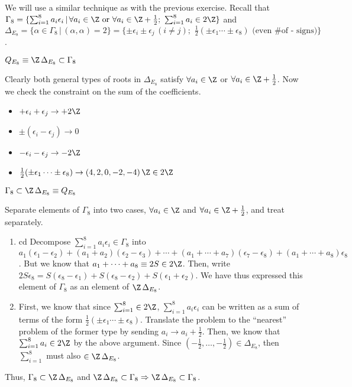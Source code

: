 \documentclass[11pt]{article}
\newenvironment{proof}[1][Proof]{\begin{trivlist}
\item[\hskip \labelsep {\bfseries #1}]}{\end{trivlist}}
\newenvironment{solution}[1][Solution]{\begin{trivlist}
\item[\hskip \labelsep {\bfseries #1}]}{\end{trivlist}}
\newenvironment{claim}[1][Claim]{\begin{trivlist}
\item[\hskip \labelsep {\bfseries #1}]}{\end{trivlist}}
\newcommand{\qed}{\nobreak \ifvmode \relax \else
      \ifdim\lastskip<1.5em \hskip-\lastskip
      \hskip1.5em plus0em minus0.5em \fi \nobreak
      \vrule height0.75em width0.5em depth0.25em\fi}
\begin{document}
\begin{solution}
We will use a similar technique as with the previous exercise.
Recall that $\Gamma_8 = \{ \sum_{i=1}^8 a_i \epsilon_i \, | \,
\forall a_i \in \Z \mbox{ or } \forall a_i \in \Z + \frac{1}{2};
\,\, \sum_{i=1}^8 a_i \in 2 \Z \}$ and $\Delta_{E_8} = \{ \alpha
\in \Gamma_8 \, | \, (\alpha,\alpha) = 2 \} = \{ \pm \epsilon_i
\pm \epsilon_j \, (i \not = j); \,\, \frac{1}{2}(\pm \epsilon_1
\cdots \pm \epsilon_8) \mbox{ (even \# of - signs)} \}$.
%
\begin{claim}
$Q_{E_8} \equiv \Z \, \Delta_{E_8} \subset \Gamma_8$
\end{claim}
%
\begin{proof}
Clearly both general types of roots in $\Delta_{E_8}$ satisfy
$\forall a_i \in \Z$ or $\forall a_i \in \Z + \frac{1}{2}$.  Now
we check the constraint on the sum of the coefficients.
%
\begin{itemize}
\item $+\epsilon_i + \epsilon_j \rightarrow +2\Z$ \item $\pm
(\epsilon_i - \epsilon_j ) \rightarrow 0$ \item $-\epsilon_i -
\epsilon_j \rightarrow -2 \Z$ \item $\frac{1}{2}(\pm \epsilon_1
\cdots \pm \epsilon_8) \rightarrow (4,2,0,-2,-4) \, \Z \in 2 \Z$

\end{itemize}
\end{proof}
%
\begin{claim}
$\Gamma_8 \subset \Z \, \Delta_{E_8} \equiv Q_{E_8}$
\end{claim}
%
\begin{proof}
Separate elements of $\Gamma_8$ into two cases, $\forall a_i \in
\Z$ and $\forall a_i \in \Z + \frac{1}{2}$, and treat separately.
\begin{enumerate}
\item cd Decompose $\sum_{i=1}^8 a_i \epsilon_i \in \Gamma_8$ into
$a_1 (\epsilon_1 - \epsilon_2) + (a_1+a_2)(\epsilon_2-\epsilon_3)
+ \cdots + (a_1+\cdots +a_7)(\epsilon_7 - \epsilon_8) +
(a_1+\cdots + a_8)\epsilon_8$.  But we know that $a_1+\cdots + a_8
\equiv 2 S \in 2 \Z$.  Then, write $2 S \epsilon_8 = S (\epsilon_8
- \epsilon_1) + S (\epsilon_8 - \epsilon_2) + S (\epsilon_1 +
\epsilon_2)$.  We have thus expressed this element of $\Gamma_8$
as an element of $\Z \, \Delta_{E_8}$.

\item First, we know that since $\sum _{i=1}^{8} \in 2 \Z$,
$\sum_{i=1}^{8} a_i \epsilon_i$ can be written as a sum of terms
of the form $\frac{1}{2}(\pm \epsilon_1 \cdots \pm \epsilon_8)$.
Translate the problem to the ``nearest'' problem of the former
type by sending $a_i \rightarrow a_i + \frac{1}{2}$. Then, we know
that $\sum _{i=1}^{8} a_i \in 2 \Z$ by the above argument. Since
$(-\frac{1}{2},\ldots,-\frac{1}{2}) \in \Delta_{E_8}$, then $\sum
_{i=1}^{8}$ must also $\in \Z \, \Delta_{E_8}$.
\end{enumerate}
\end{proof}
Thus, $\Gamma_8 \subset \Z \, \Delta_{E_8}$ and $\Z \,
\Delta_{E_8} \subset \Gamma_8 \Rightarrow \Z \, \Delta_{E_8}
\subset \Gamma_8$. \qed
\end{solution}
\end{document}
